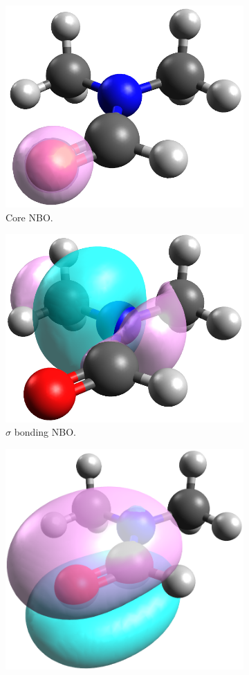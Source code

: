 \begin{refsection}
\begin{figure}
    \centering
    \begin{subfigure}{0.3\linewidth}
        \includegraphics[width=0.8\linewidth]{Figures/dmfnbo-core.png}
        \caption{Core NBO.}
    \end{subfigure}
    \begin{subfigure}{0.3\linewidth}
        \includegraphics[width=0.8\linewidth]{Figures/dmfnbo-sigma.png}
        \caption{$ \sigma $ bonding NBO.}
    \end{subfigure}
    \begin{subfigure}{0.3\linewidth}
        \includegraphics[width=0.8\linewidth]{Figures/dmfnbo-pi.png}

\end{subfigure}
\end{figure}
\end{refsection}
